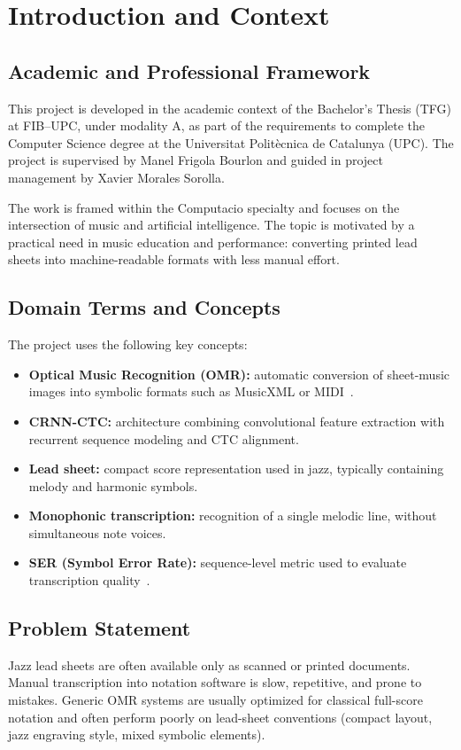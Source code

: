\documentclass[11pt, a4paper]{article}
\begin{document}
\tableofcontents
\newpage

\section{Introduction and Context}
\label{sec:intro-context}

\subsection{Academic and Professional Framework}
This project is developed in the academic context of the Bachelor's Thesis (TFG) at FIB--UPC, under modality A, as part of the requirements to complete the Computer Science degree at the Universitat Polit\`ecnica de Catalunya (UPC). The project is supervised by Manel Frigola Bourlon and guided in project management by Xavier Morales Sorolla.

The work is framed within the Computacio specialty and focuses on the intersection of music and artificial intelligence. The topic is motivated by a practical need in music education and performance: converting printed lead sheets into machine-readable formats with less manual effort.

\subsection{Domain Terms and Concepts}
The project uses the following key concepts:
\begin{itemize}
    \item \textbf{Optical Music Recognition (OMR):} automatic conversion of sheet-music images into symbolic formats such as MusicXML or MIDI~\cite{shatriOPTICALMUSICRECOGNITION}.
    \item \textbf{CRNN-CTC:} architecture combining convolutional feature extraction with recurrent sequence modeling and CTC alignment.
    \item \textbf{Lead sheet:} compact score representation used in jazz, typically containing melody and harmonic symbols.
    \item \textbf{Monophonic transcription:} recognition of a single melodic line, without simultaneous note voices.
    \item \textbf{SER (Symbol Error Rate):} sequence-level metric used to evaluate transcription quality~\cite{SymbolErrorRate}.
\end{itemize}

\subsection{Problem Statement}
Jazz lead sheets are often available only as scanned or printed documents. Manual transcription into notation software is slow, repetitive, and prone to mistakes. Generic OMR systems are usually optimized for classical full-score notation and often perform poorly on lead-sheet conventions (compact layout, jazz engraving style, mixed symbolic elements).
\end{document}
